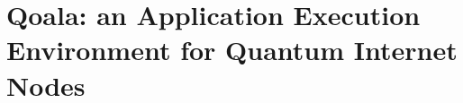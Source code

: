 \chapter
 [Qoala: an Application Execution Environment for Quantum Internet Nodes]
 {Qoala: an Application Execution Environment for Quantum Internet Nodes}
\label{chp:qoala}











\clearpage

\clearpage

\clearpage

\clearpage
